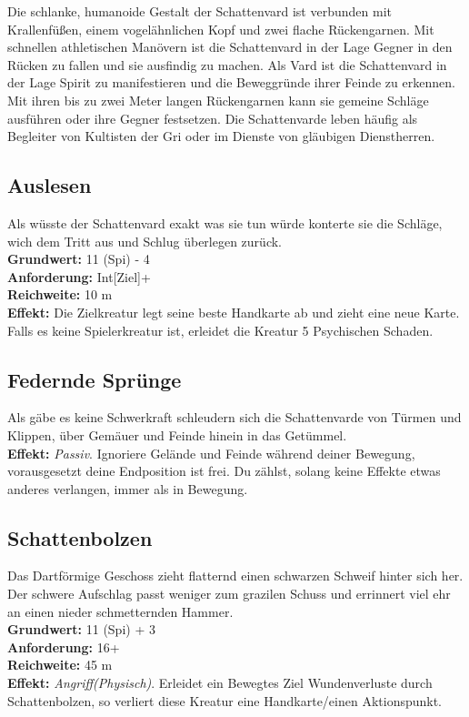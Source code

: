 Die schlanke, humanoide Gestalt der Schattenvard ist verbunden mit Krallenfüßen, einem vogelähnlichen Kopf und zwei flache Rückengarnen. Mit schnellen athletischen Manövern ist die Schattenvard in der Lage Gegner in den Rücken zu fallen und sie ausfindig zu machen. Als Vard ist die Schattenvard in der Lage Spirit zu manifestieren und die Beweggründe ihrer Feinde zu erkennen. Mit ihren bis zu zwei Meter langen Rückengarnen kann sie gemeine Schläge ausführen oder ihre Gegner festsetzen. Die Schattenvarde leben häufig als Begleiter von Kultisten der Gri oder im Dienste von gläubigen Dienstherren.

\subsection*{Auslesen}
Als wüsste der Schattenvard exakt was sie tun würde konterte sie die Schläge, wich dem Tritt aus und Schlug überlegen zurück.\\
\textbf{Grundwert:} 11 (Spi) - 4\\
\textbf{Anforderung:} Int[Ziel]+\\
\textbf{Reichweite:} 10 m \\
\textbf{Effekt:} Die Zielkreatur legt seine beste Handkarte ab und zieht eine neue Karte. Falls es keine Spielerkreatur ist, erleidet die Kreatur 5 Psychischen Schaden.

\subsection*{Federnde Sprünge}
Als gäbe es keine Schwerkraft schleudern sich die Schattenvarde von Türmen und Klippen, über Gemäuer und Feinde hinein in das Getümmel.\\
\textbf{Effekt:} \textit{Passiv}. Ignoriere Gelände und Feinde während deiner Bewegung, vorausgesetzt deine Endposition ist frei. Du zählst, solang keine Effekte etwas anderes verlangen, immer als in Bewegung.

\subsection*{Schattenbolzen}
Das Dartförmige Geschoss zieht flatternd einen schwarzen Schweif hinter sich her. Der schwere Aufschlag passt weniger zum grazilen Schuss und errinnert viel ehr an einen nieder schmetternden Hammer. \\
\textbf{Grundwert:} 11 (Spi) + 3\\
\textbf{Anforderung:} 16+\\
\textbf{Reichweite:} 45 m \\
\textbf{Effekt:} \textit{Angriff(Physisch)}. Erleidet ein Bewegtes Ziel Wundenverluste durch Schattenbolzen, so verliert diese Kreatur eine Handkarte/einen Aktionspunkt.

